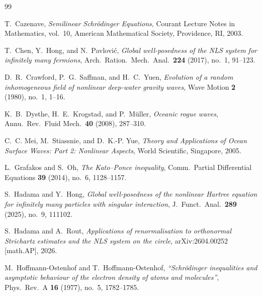 \documentclass[11pt]{amsart}
\theoremstyle{definition}
\begin{document}
\begin{thebibliography}{99}

T.~Cazenave, \emph{Semilinear Schr\"odinger Equations}, Courant Lecture Notes in Mathematics, vol.~10, American Mathematical Society, Providence, RI, 2003.

T.~Chen, Y.~Hong, and N.~Pavlovi\'c, \emph{Global well-posedness of the NLS system for infinitely many fermions}, Arch.\ Ration.\ Mech.\ Anal.\ \textbf{224} (2017), no.~1, 91--123.

D.~R.~Crawford, P.~G.~Saffman, and H.~C.~Yuen, \emph{Evolution of a random inhomogeneous field of nonlinear deep-water gravity waves}, Wave Motion \textbf{2} (1980), no.~1, 1--16.

K.~B.~Dysthe, H.~E.~Krogstad, and P.~M\"uller, \emph{Oceanic rogue waves}, Annu.\ Rev.\ Fluid Mech.\ \textbf{40} (2008), 287--310.

C.~C. Mei, M.~Stiassnie, and D.~K.-P. Yue, \emph{Theory and Applications of Ocean Surface Waves: Part 2: Nonlinear Aspects}, World Scientific, Singapore, 2005.



L.~Grafakos and S.~Oh, \emph{The Kato--Ponce inequality}, Comm.\ Partial Differential Equations \textbf{39} (2014), no.~6, 1128--1157.

S.~Hadama and Y.~Hong, \emph{Global well-posedness of the nonlinear Hartree equation for infinitely many particles with singular interaction}, J.\ Funct.\ Anal.\ \textbf{289} (2025), no.~9, 111102.

S.~Hadama and A.~Rout, \emph{Applications of renormalisation to orthonormal Strichartz estimates and the NLS system on the circle}, arXiv:2604.00252 [math.AP], 2026.

M.~Hoffmann-Ostenhof and T.~Hoffmann-Ostenhof, \emph{``Schr\"odinger inequalities and asymptotic behaviour of the electron density of atoms and molecules''}, Phys.\ Rev.\ A \textbf{16} (1977), no.~5, 1782--1785.


\end{thebibliography}
\end{document}
